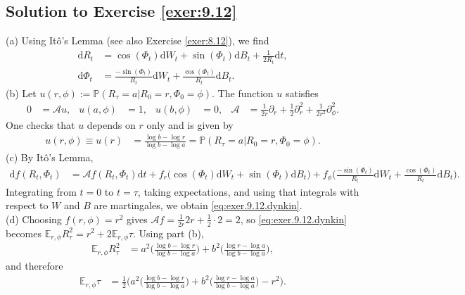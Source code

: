 \documentclass[12pt]{book}
\numberwithin{equation}{chapter}
\theoremstyle{plain}
\numberwithin{theorem}{section}
\theoremstyle{definition}
\numberwithin{exercise}{chapter}
\newcommand{\<}{\langle}
\renewcommand{\>}{\rangle}
\renewcommand{\(}{\left(}
\renewcommand{\)}{\right)}
\renewcommand{\[}{\left[}
\renewcommand{\]}{\right]}
\newcommand\Eb{\mathds{E}}
\newcommand\Pb{\mathds{P}}
\newcommand\Ac{\mathscr{A}}
\renewcommand\d{\partial}
\newcommand\dd{\mathrm{d}}
\begin{document}
\subsection*{Solution to Exercise \ref{exer:9.12}}
(a) Using It\^o's Lemma (see also Exercise \ref{exer:8.12}), we find
\begin{align}
\dd R_t
	&=	\cos (\Phi_t) \dd W_t + \sin (\Phi_t) \dd B_t + \frac{1}{2 R_t}  \dd t , \\
\dd \Phi_t
	&=	\frac{- \sin (\Phi_t)}{R_t} \dd W_t + \frac{ \cos( \Phi_t)}{R_t} \dd B_t .
\end{align}
(b) Let $u(r,\phi) := \Pb( R_\tau = a | R_0 = r, \Phi_0 = \phi )$.  The function $u$ satisfies
\begin{align}
0
	&=	\Ac u , &
u(a,\phi)
	&= 1 , &
u(b,\phi)
	&=	0 , &
\Ac
	&=	\frac{1}{2 r} \d_r + \frac{1}{2} \d_r^2 + \frac{1}{2r^2} \d_\phi^2 .
\end{align}
One checks that $u$ depends on $r$ only and is given by
\begin{align}
u(r,\phi) \equiv u(r)
	&=	\frac{\log b - \log r}{\log b - \log a} = \Pb( R_\tau = a | R_0 = r, \Phi_0 = \phi) .
\end{align}
(c) By It\^o's Lemma,
\begin{align}
\dd f(R_t,\Phi_t)
	&=	\Ac f(R_t,\Phi_t) \dd t 
			+ f_r \Big( \cos (\Phi_t) \dd W_t + \sin (\Phi_t) \dd B_t \Big) 
			+	f_\phi \Big( \frac{- \sin (\Phi_t)}{R_t} \dd W_t + \frac{ \cos( \Phi_t)}{R_t} \dd B_t \Big) .
\end{align}
Integrating from $t= 0$ to $t = \tau$, taking expectations, and using that integrals with respect to $W$ and $B$ are martingales, we obtain \eqref{eq:exer.9.12.dynkin}.
\\[0.5em]
(d) Choosing $f(r,\phi) = r^2$ gives $\Ac f = \frac{1}{2r} 2 r + \frac{1}{2} \cdot 2 = 2$, so \eqref{eq:exer.9.12.dynkin} becomes $\Eb_{r,\phi} R_\tau^2 = r^2 + 2 \Eb_{r,\phi} \tau$.  Using part (b),
\begin{align}
\Eb_{r,\phi} R_\tau^2
	&=	a^2 \Big( \frac{\log b - \log r}{\log b - \log a} \Big) + b^2 \Big( \frac{\log r - \log a}{\log b - \log a} \Big) ,
\end{align}
and therefore
\begin{align}
\Eb_{r,\phi} \tau
	&=	\frac{1}{2} \Big( a^2 \Big( \frac{\log b - \log r}{\log b - \log a} \Big) + b^2 \Big( \frac{\log r - \log a}{\log b - \log a} \Big) - r^2 \Big) .
\end{align}

\end{document}
